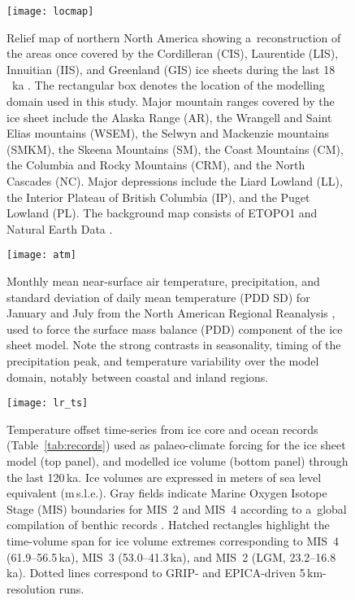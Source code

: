 \documentclass[tc, manuscript]{copernicus}
\begin{document}
\begin{figure}%
\texttt{[image: locmap]}
\caption{%
Relief map of northern North America showing a~reconstruction of the
           areas once covered by the Cordilleran (CIS), Laurentide (LIS),
           Innuitian (IIS), and Greenland (GIS) ice sheets during the last
           18\,\unit{\,ka} \citep[21.4\,cal\,ka,][]{Dyke.2004}.
           The rectangular box denotes the location of the
           modelling domain used in this study. Major mountain ranges covered
           by the ice sheet include the Alaska Range (AR), the Wrangell and
           Saint Elias mountains (WSEM), the Selwyn and Mackenzie mountains
           (SMKM), the Skeena Mountains (SM), the Coast Mountains (CM), the
           Columbia and Rocky
           Mountains (CRM), and the North Cascades (NC). Major depressions
           include the Liard Lowland (LL), the Interior Plateau of British
           Columbia (IP), and the Puget Lowland (PL). The background
           map consists of ETOPO1 \citep{Amante.Eakins.2009} and Natural Earth
           Data \citep{Patterson.Kelso.2015}.}
\label{fig:locmap}%
\end{figure}%


\begin{figure}%
\texttt{[image: atm]}
\caption{%
Monthly mean near-surface air temperature, precipitation, and
           standard deviation of daily mean temperature (PDD SD) for January
           and July from the North American Regional Reanalysis
           \citep[NARR;][]{Mesinger.etal.2006}, used to force the surface mass
           balance (PDD) component of the ice sheet model. Note the
           strong contrasts in seasonality, timing of the precipitation peak,
           and temperature variability over the model domain, notably between
           coastal and inland regions.}
\label{fig:atm}%
\end{figure}%


\begin{figure}%
\texttt{[image: lr\_ts]}
\caption{%
Temperature offset time-series from ice core and ocean records
           (Table~\ref{tab:records}) used as palaeo-climate forcing for the ice
           sheet model (top panel), and modelled ice volume (bottom panel)
           through the last 120\,\unit{ka}. Ice volumes are expressed in meters of sea
           level equivalent (m\,s.l.e.). Gray fields indicate Marine Oxygen
           Isotope Stage (MIS) boundaries for MIS~2 and MIS~4 according to
           a~global compilation of benthic  records
           \citep{Lisiecki.Raymo.2005}. Hatched rectangles highlight the
           time-volume span for ice volume extremes corresponding to MIS~4
           (61.9--56.5\,\unit{ka}), MIS~3 (53.0--41.3\,\unit{ka}), and MIS~2 (LGM,
           23.2--16.8\,\unit{ka}). Dotted lines correspond to GRIP- and EPICA-driven
           5\,\unit{km}-resolution runs.}
\label{fig:lr_ts}%
\end{figure}%
\end{document}
